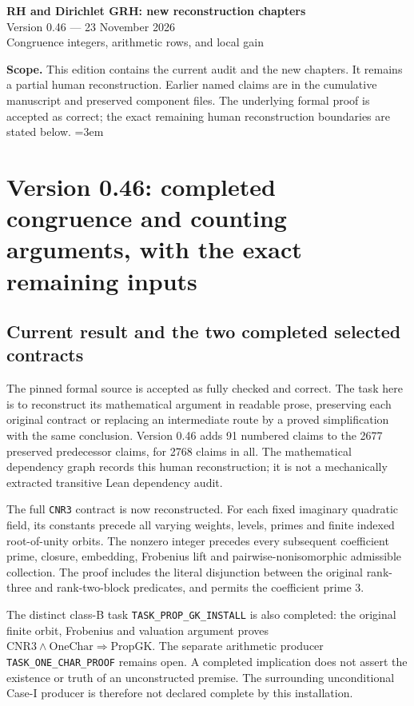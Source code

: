 \documentclass[11pt,a4paper]{article}
\numberwithin{equation}{section}
\theoremstyle{remark}\newtheorem{remark}[theorem]{Remark}
\begin{document}
\begin{center}
{\LARGE\bfseries RH and Dirichlet GRH: new reconstruction chapters}\\[7pt]
{\large Version 0.46 --- 23 November 2026}\\[5pt]
{\large Congruence integers, arithmetic rows, and local gain}
\end{center}
\textbf{Scope.} This edition contains the current audit and the new
chapters. It remains a partial human reconstruction. Earlier named
claims are in the cumulative manuscript and preserved component files.
The underlying formal proof is accepted as correct; the exact remaining
human reconstruction boundaries are stated below.
\setcounter{tocdepth}{1}
\tableofcontents
\clearpage
\begingroup\emergencystretch=3em
\section{Version 0.46: completed congruence and counting arguments, with the exact remaining inputs}
\label{sec:dependency-audit-v46}

\subsection{Current result and the two completed selected contracts}

The pinned formal source is accepted as fully checked and correct.
The task here is to reconstruct its mathematical argument in readable
prose, preserving each original contract or replacing an intermediate
route by a proved simplification with the same conclusion.
Version 0.46 adds 91 numbered claims to the 2677 preserved predecessor
claims, for 2768 claims in all. The mathematical dependency graph
records this human reconstruction; it is not a mechanically extracted
transitive Lean dependency audit.

The full \texttt{CNR3} contract is now reconstructed. For each fixed
imaginary quadratic field, its constants precede all varying weights,
levels, primes and finite indexed root-of-unity orbits. The nonzero
integer precedes every subsequent coefficient prime, closure, embedding,
Frobenius lift and pairwise-nonisomorphic admissible collection. The
proof includes the literal disjunction between the original rank-three
and rank-two-block predicates, and permits the coefficient prime 3.

The distinct class-B task \texttt{TASK\_\allowbreak PROP\_\allowbreak GK\_\allowbreak INSTALL} is also
completed: the original finite orbit, Frobenius and valuation argument
proves \(\mathrm{CNR3}\land\mathrm{OneChar}\Rightarrow
\mathrm{PropGK}\). The separate arithmetic producer
\texttt{TASK\_\allowbreak ONE\_\allowbreak CHAR\_\allowbreak PROOF} remains open. A completed implication
does not assert the existence or truth of an unconstructed premise.
The surrounding unconditional Case-I producer is therefore not declared
complete by this installation.
\end{document}
